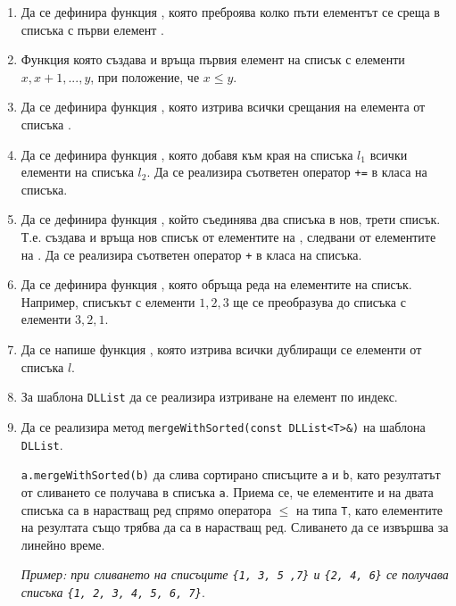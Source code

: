 \begin{enumerate}

	\item  Да се дефинира функция , която преброява колко пъти елементът  се среща в списъка с първи елемент .
	\item  Функция  която създава и връща първия елемент на списък с елементи $x, x+1, ..., y$, при положение, че $x \leq y$.
	\item  Да се дефинира функция , която изтрива всички срещания на елемента  от списъка .
	\item  Да се дефинира функция , която добавя към края на списъка $l_1$ всички елементи на списъка $l_2$. Да се реализира съответен оператор \texttt{+=} в класа на списъка.
	\item  Да се дефинира функция , който съединява два списъка в нов, трети списък. Т.е.  създава и връща нов списък от елементите на , следвани от елементите на . Да се реализира съответен оператор \texttt{+} в класа на списъка.
	\item  Да се дефинира функция , която обръща реда на елементите на списък. Например, списъкът с елементи $1,2,3$ ще се преобразува до списъка с елементи $3,2,1$.
	\item Да се напише функция , която изтрива всички дублиращи се елементи от списъка $l$.
  \item За шаблона \texttt{DLList} да се реализира изтриване на елемент по индекс.
  \item Да се реализира метод \texttt{mergeWithSorted(const DLList<T>\&)} на шаблона \texttt{DLList}. 
  
  \texttt{a.mergeWithSorted(b)} да слива сортирано списъците \texttt{a} и \texttt{b}, като резултатът от сливането се получава в списъка \texttt{a}. Приема се, че елементите и на двата списъка са в нарастващ ред спрямо оператора $\leq$ на типа \texttt{T}, като елементите на резултата също трябва да са в нарастващ ред. Сливането да се извършва за линейно време. 
  
  \emph{Пример: при сливането на списъците \texttt{\{1, 3, 5 ,7\}} и \texttt{\{2, 4, 6\}} се получава списъка \texttt{\{1, 2, 3, 4, 5, 6, 7\}}}.

\end{enumerate}

